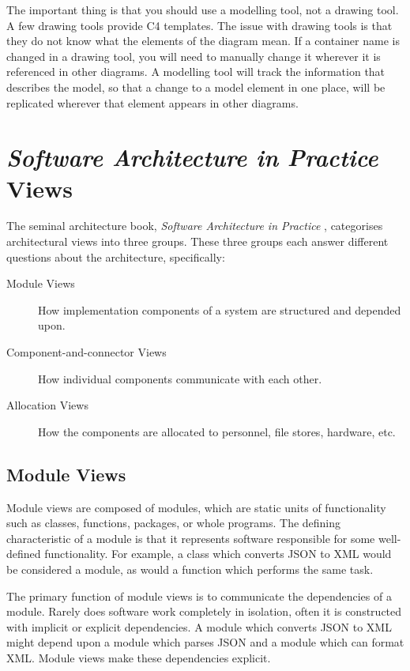 The important thing is that you should use a modelling tool, not a drawing tool.
A few drawing tools provide C4 templates.
The issue with drawing tools is that they do not know what the elements of the diagram mean.
If a container name is changed in a drawing tool, you will need to manually change it wherever it is referenced in other diagrams.
A modelling tool will track the information that describes the model, so that a change to a model element in one place,
will be replicated wherever that element appears in other diagrams.




\section{\textit{Software Architecture in Practice} Views}
The seminal architecture book, \textit{Software Architecture in Practice} \cite{bass2021software},
categorises architectural views into three groups.
These three groups each answer different questions about the architecture, specifically:
\begin{description}
    \item[Module Views] How implementation components of a system are structured and depended upon.
    \item[Component-and-connector Views] How individual components communicate with each other.
    \item[Allocation Views] How the components are allocated to personnel, file stores, hardware, etc.
\end{description}

\subsection{Module Views}
Module views are composed of modules, which are static units of functionality such as classes, functions, packages, or whole programs.
The defining characteristic of a module is that it represents software responsible for some well-defined functionality.
For example, a class which converts JSON to XML would be considered a module, as would a function which performs the same task.

The primary function of module views is to communicate the dependencies of a module.
Rarely does software work completely in isolation, often it is constructed with implicit or explicit dependencies.
A module which converts JSON to XML might depend upon a module which parses JSON and a module which can format XML.
Module views make these dependencies explicit.

